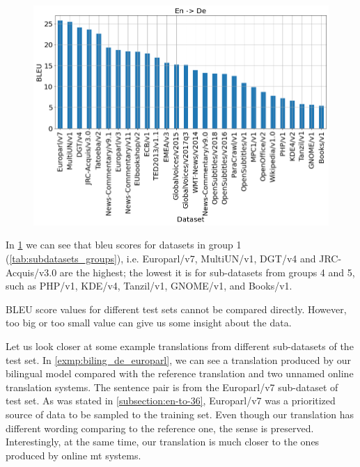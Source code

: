 \begin{figure}[h]
	\centering
	\includegraphics[width=0.9\columnwidth]{img/bilingual_en_de.png}
	\label{fig:bilingual_en_de}
\end{figure}



In \cref{fig:bilingual_en_de} we can see that \acrshort{bleu} scores
for datasets in group 1 (\cref{tab:subdatasets_groups}), i.e.
Europarl/v7, MultiUN/v1, DGT/v4 and JRC-Acquis/v3.0 are the highest;
the lowest it is for sub-datasets from groups 4 and 5, such as
PHP/v1, KDE/v4, Tanzil/v1, GNOME/v1, and Books/v1.

BLEU score values for different test sets cannot be compared directly.
However, too big or too small value can give us some insight about the
data.

Let us look closer at some example translations from different
sub-datasets of the  test set.
In \cref{exmp:biling_de_europarl}, we can see a translation produced
by our bilingual  model compared with the reference translation
and two unnamed online translation systems.
The sentence pair is from the Europarl/v7 sub-dataset of
 test set.
As was stated in \cref{subsection:en-to-36}, Europarl/v7 was a prioritized
source of data to be sampled to the training set.
Even though our translation has different wording comparing to the reference one,
the sense is preserved.
Interestingly, at the same time, our translation is much closer
to the ones produced by online \acrshort{mt} systems.

